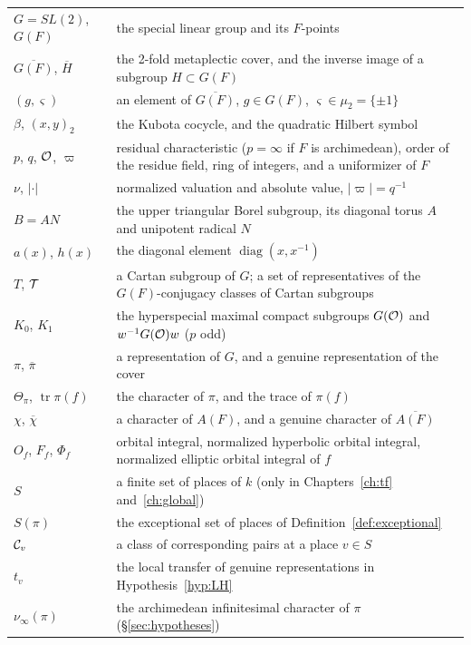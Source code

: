 \documentclass[12pt,letterpaper]{book}
\theoremstyle{plain}
\theoremstyle{definition}
\theoremstyle{remark}
\theoremstyle{remark}
\newcommand{\tr}{\operatorname{tr}}
\begin{document}
\medskip
\begin{center}
\renewcommand{\arraystretch}{1.15}
\begin{tabular}{p{}p{}}
\hline
$G=SL(2)$, $G(F)$ & the special linear group and its $F$-points\\
$\overline{G(F)}$, $\overline{H}$ & the 2-fold metaplectic cover, and the
inverse image of a subgroup $H\subset G(F)$\\
$(g,\varsigma)$ & an element of $\overline{G(F)}$, $g\in G(F)$,
$\varsigma\in\mu_2=\{\pm1\}$\\
$\beta$, $(x,y)_2$ & the Kubota cocycle, and the quadratic Hilbert
symbol\\
$p$, $q$, ${\cal O}$, $\varpi$ & residual characteristic ($p=\infty$ if
$F$ is archimedean), order of the residue field, ring of integers, and a
uniformizer of $F$ \\
$\nu$, $|\cdot|$ & normalized valuation and absolute value,
$|\varpi|=q^{-1}$\\
$B=AN$ & the upper triangular Borel subgroup, its diagonal torus $A$ and
unipotent radical $N$\\
$a(x)$, $h(x)$ & the diagonal element $\operatorname{diag}(x,x^{-1})$\\
$T$, ${\cal T}$ & a Cartan subgroup of $G$; a set of representatives of
the $G(F)$-conjugacy classes of Cartan subgroups\\
$K_0$, $K_1$ & the hyperspecial maximal compact subgroups $G({\cal O})$
and $w^{-1}G({\cal O})w$ ($p$ odd)\\
$\pi$, $\overline{\pi}$ & a representation of $G$, and a genuine
representation of the cover\\
$\Theta_\pi$, $\tr\pi(f)$ & the character of $\pi$, and the trace of
$\pi(f)$\\
$\chi$, $\overline{\chi}$ & a character of $A(F)$, and a genuine
character of $\overline{A(F)}$\\
$O_f$, $F_f$, $\Phi_f$ & orbital integral, normalized hyperbolic orbital
integral, normalized elliptic orbital integral of $f$\\
$S$ & a finite set of places of $k$ (only in Chapters~\ref{ch:tf}
and~\ref{ch:global})\\
$S(\pi)$ & the exceptional set of places of
Definition~\ref{def:exceptional}\\
${\cal C}_v$ & a class of corresponding pairs at a place $v\in S$\\
$t_v$ & the local transfer of genuine representations in
Hypothesis~\ref{hyp:LH}\\
$\nu_\infty(\pi)$ & the archimedean infinitesimal character of $\pi$
(\S\ref{sec:hypotheses})\\
\hline
\end{tabular}
\end{center}
\end{document}
